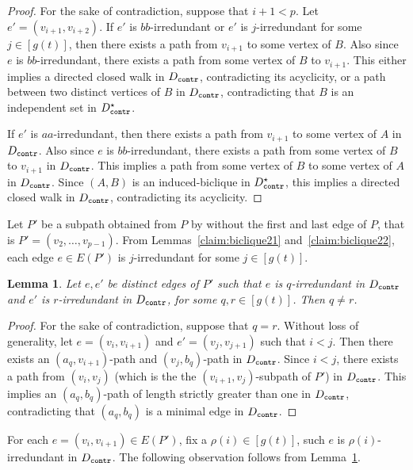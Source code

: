 \documentclass[a4paper,11pt]{article}
\theoremstyle{plain}
\newtheorem{lemma}[theorem]{Lemma}
\newtheorem{identification rule}{Identification Rule}
\theoremstyle{definition}
\theoremstyle{remark}
\newcommand{\contr}{\textnormal{\texttt{contr}}}
\newcommand{\Dcontr}{D_{\contr}}
\begin{document}
\begin{proof}
For the sake of contradiction, suppose that $i+1<p$. Let $e'=(v_{i+1},v_{i+2})$. 
If $e'$ is $bb$-irredundant or $e'$ is $j$-irredundant for some $j \in [g(t)]$, then there exists a path from $v_{i+1}$ to some vertex of $B$. Also since $e$ is $bb$-irredundant, there exists a path from some vertex of $B$ to $v_{i+1}$. This either implies a directed closed walk in $\Dcontr$, contradicting its acyclicity, or a path between two distinct vertices of $B$ in $\Dcontr$, contradicting that $B$ is an independent set in $\Dcontr^{\star}$.

If $e'$ is $aa$-irredundant, then there exists a path from $v_{i+1}$ to some vertex of $A$ in $\Dcontr$. Also since $e$ is $bb$-irredundant, there exists a path from some vertex of $B$ to $v_{i+1}$ in $\Dcontr$. This implies a path from some vertex of $B$ to some vertex of $A$ in $\Dcontr$. Since 
$(A,B)$ is an induced-biclique in $\Dcontr^{\star}$, this implies a directed closed walk
in $\Dcontr$, contradicting its acyclicity.
\end{proof}

Let $P'$ be a subpath obtained from $P$ by without the first and last edge of $P$, that is $P'=(v_2, \ldots,v_{p-1})$. From Lemmas~\ref{claim:biclique21} and~\ref{claim:biclique22}, each edge $e \in E(P')$ is $j$-irredundant for some $j \in [g(t)]$.

\begin{lemma}\label{claim:biclique3}
Let $e,e'$ be distinct edges of $P'$ such that $e$ is $q$-irredundant in $\Dcontr$ and $e'$ is $r$-irredundant in $\Dcontr$, for some $q,r \in [g(t)]$. Then $q \neq r$.
\end{lemma}

\begin{proof}
For the sake of contradiction, suppose that $q=r$. Without loss of generality, let $e=(v_i,v_{i+1})$ and $e'=(v_j,v_{j+1})$ such that $i<j$. Then there exists an $(a_q,v_{i+1})$-path and $(v_j,b_q)$-path in $\Dcontr$. Since $i < j$, there exists a path from $(v_i,v_j)$ (which is the the $(v_{i+1},v_j)$-subpath of $P'$) in $\Dcontr$. This implies an $(a_q,b_q)$-path of length strictly greater than one in $\Dcontr$, contradicting that $(a_q,b_q)$ is a minimal edge in $\Dcontr$.
\end{proof}

For each $e=(v_i,v_{i+1}) \in E(P')$, fix a $\rho(i) \in [g(t)]$, such $e$ is $\rho(i)$-irredundant in $\Dcontr$. 
The following observation follows from Lemma~\ref{claim:biclique3}.
\end{document}
